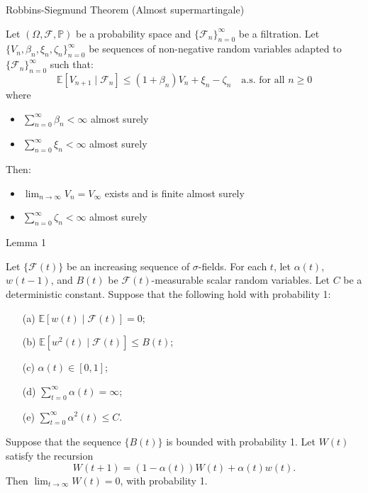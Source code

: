 \documentclass[aspectratio=169]{beamer} %
\begin{document}
\begin{frame}{Robbins-Siegmund Theorem (Almost supermartingale)}
\begin{theorem}\label{thm:robbins siegmund}
Let $(\Omega, \mathcal{F}, \mathbb{P})$ be a probability space and $\{\mathcal{F}_n\}_{n=0}^{\infty}$ be a filtration. Let $\{V_n,\beta_n, \xi_n, \zeta_n\}_{n=0}^\infty$ be sequences of non-negative random variables adapted to $\{\mathcal{F}_n\}_{n=0}^{\infty}$ such that:
$$
\mathbb{E}[V_{n+1} \mid \mathcal{F}_n] \leq (1+\beta_n)V_n+\xi_n-\zeta_n\quad \text{a.s. for all } n \geq 0
$$
where
\begin{itemize}
    \item $\sum_{n=0}^\infty \beta_n<\infty$ almost surely
    \item $\sum_{n=0}^\infty \xi_n<\infty$ almost surely
\end{itemize}
Then:
\begin{itemize}
    \item $\lim_{n\to\infty}V_n = V_\infty$ exists and is finite almost surely
    \item $\sum_{n=0}^\infty \zeta_n<\infty$ almost surely
\end{itemize}
\end{theorem}
    
\end{frame}

\begin{frame}{Lemma 1}
\begin{lemma}\label{lm:1}
Let $\{\mathcal{F}(t)\}$ be an increasing sequence of $\sigma$-fields. For each $t$, let $\alpha(t)$, $w(t-1)$, and $B(t)$ be $\mathcal{F}(t)$-measurable scalar random variables. Let $C$ be a deterministic constant. Suppose that the following hold with probability 1:
\begin{enumerate}
\item[(a)] $\mathbb{E}[w(t) \mid \mathcal{F}(t)] = 0$;
\item[(b)] $\mathbb{E}[w^2(t) \mid \mathcal{F}(t)] \leq B(t)$;
\item[(c)] $\alpha(t) \in [0,1]$;
\item[(d)] $\sum_{t=0}^{\infty} \alpha(t) = \infty$;
\item[(e)] $\sum_{t=0}^{\infty} \alpha^2(t) \leq C$.
\end{enumerate}
Suppose that the sequence $\{B(t)\}$ is bounded with probability 1. Let $W(t)$ satisfy the recursion
\begin{equation}
W(t+1) = (1 - \alpha(t))W(t) + \alpha(t)w(t).
\end{equation}
Then $\lim_{t \to \infty} W(t) = 0$, with probability 1.
\end{lemma}
    
\end{frame}
\end{document}
